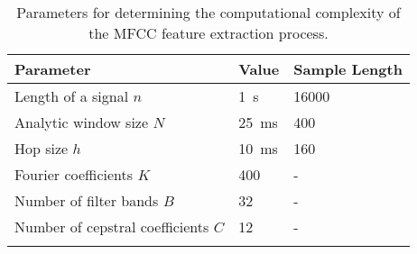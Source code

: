 \begin{table}[ht!]
\small
\begin{center}
\caption{Parameters for determining the computational complexity of the MFCC feature extraction process.}
\begin{tabular}{ M{7cm}  M{2.5cm} M{2.5cm}}
\toprule
\textbf{Parameter} & \textbf{Value} & \textbf{Sample Length} \\
\midrule
Length of a signal $n$ & \SI{1}{\second} & 16000 \\
Analytic window size $N$ & \SI{25}{\milli\second} & 400 \\
Hop size $h$ & \SI{10}{\milli\second} & 160\\
\midrule
Fourier coefficients $K$ & 400  & - \\
Number of filter bands $B$ & 32 & -\\
Number of cepstral coefficients $C$ & 12 & -\\
\bottomrule
\label{tab:signal_mfcc_extraction_params}
\end{tabular}
\end{center}
\vspace{-4mm}
\end{table}
\FloatBarrier
\noindent